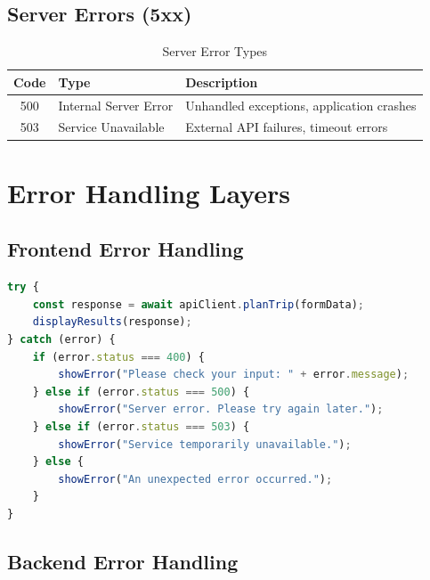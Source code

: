 \documentclass[12pt,a4paper]{report}
\begin{document}
\subsection{Server Errors (5xx)}

\begin{table}[H]
\centering
\begin{tabular}{|c|l|p{7cm}|}
\hline
\textbf{Code} & \textbf{Type} & \textbf{Description} \\
\hline
500 & Internal Server Error & Unhandled exceptions, application crashes \\
\hline
503 & Service Unavailable & External API failures, timeout errors \\
\hline
\end{tabular}
\caption{Server Error Types}
\label{tab:server-errors}
\end{table}

\section{Error Handling Layers}

\subsection{Frontend Error Handling}

\begin{lstlisting}[language=JavaScript, style=pythonstyle, caption={Frontend Error Handler}]
try {
    const response = await apiClient.planTrip(formData);
    displayResults(response);
} catch (error) {
    if (error.status === 400) {
        showError("Please check your input: " + error.message);
    } else if (error.status === 500) {
        showError("Server error. Please try again later.");
    } else if (error.status === 503) {
        showError("Service temporarily unavailable.");
    } else {
        showError("An unexpected error occurred.");
    }
}
\end{lstlisting}

\subsection{Backend Error Handling}
\end{document}
